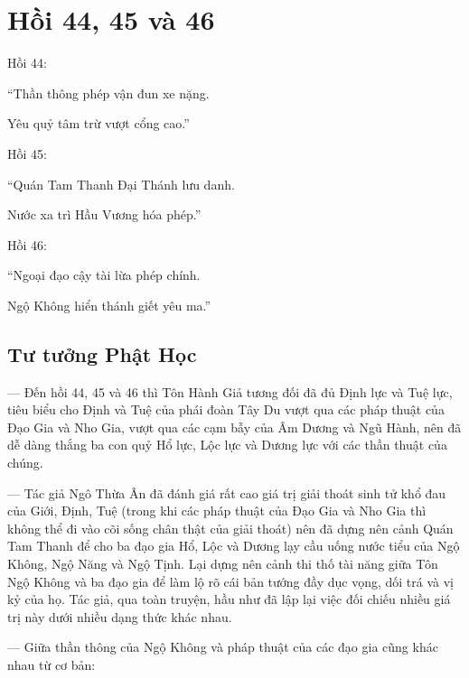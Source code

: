 \chapter{Hồi 44, 45 và 46} %
\label{cha:hoi_44_45}

Hồi 44:

\begin{itshape}
``Thần thông phép vận đun xe nặng.

Yêu quỷ tâm trừ vượt cổng cao.''
\end{itshape}

Hồi 45:

\begin{itshape}
``Quán Tam Thanh Đại Thánh lưu danh.

Nước xa trì Hầu Vương hóa phép.''
\end{itshape}

Hồi 46:

\begin{itshape}
``Ngoại đạo cậy tài lừa phép chính.

Ngộ Không hiển thánh giết yêu ma.''
\end{itshape}

\section{Tư tưởng Phật Học} %
\label{sec:44_45_phat_hoc}

--- Đến hồi 44, 45 và 46 thì Tôn Hành Giả tương đối đã đủ Định lực và Tuệ lực, tiêu biểu cho Định và Tuệ của phái đoàn Tây Du vượt qua các pháp thuật của Đạo Gia và Nho Gia, vượt qua các cạm bẫy của Âm Dương và Ngũ Hành, nên đã dễ dàng thắng ba con quỷ Hổ lực, Lộc lực và Dương lực với các thần thuật của chúng.

--- Tác giả Ngô Thừa Ân đã đánh giá rất cao giá trị giải thoát sinh tử khổ đau của Giới, Định, Tuệ (trong khi các pháp thuật của Đạo Gia và Nho Gia thì không thể đi vào cõi sống chân thật của giải thoát) nên đã dựng nên cảnh Quán Tam Thanh để cho ba đạo gia Hổ, Lộc và Dương lạy cầu uống nước tiểu của Ngộ Không, Ngộ Năng và Ngộ Tịnh. Lại dựng nên cảnh thi thố tài năng giữa Tôn Ngộ Không và ba đạo gia để làm lộ rõ cái bản tướng đầy dục vọng, dối trá và vị kỷ của họ. Tác giả, qua toàn truyện, hầu như đã lập lại việc đối chiếu nhiều giá trị này dưới nhiều dạng thức khác nhau.

--- Giữa thần thông của Ngộ Không và pháp thuật của các đạo gia cũng khác nhau từ cơ bản:

